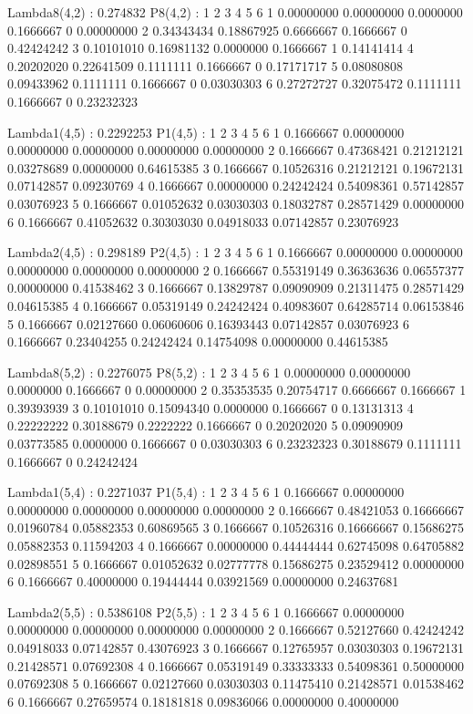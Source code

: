 \documentclass[
  nojss]{jss}
\begin{document}
\begin{CodeChunk}
\begin{CodeOutput}
Lambda8(4,2) : 0.274832
P8(4,2) : 
           1          2         3         4 5          6
1 0.00000000 0.00000000 0.0000000 0.1666667 0 0.00000000
2 0.34343434 0.18867925 0.6666667 0.1666667 0 0.42424242
3 0.10101010 0.16981132 0.0000000 0.1666667 1 0.14141414
4 0.20202020 0.22641509 0.1111111 0.1666667 0 0.17171717
5 0.08080808 0.09433962 0.1111111 0.1666667 0 0.03030303
6 0.27272727 0.32075472 0.1111111 0.1666667 0 0.23232323

Lambda1(4,5) : 0.2292253
P1(4,5) : 
          1          2          3          4          5          6
1 0.1666667 0.00000000 0.00000000 0.00000000 0.00000000 0.00000000
2 0.1666667 0.47368421 0.21212121 0.03278689 0.00000000 0.64615385
3 0.1666667 0.10526316 0.21212121 0.19672131 0.07142857 0.09230769
4 0.1666667 0.00000000 0.24242424 0.54098361 0.57142857 0.03076923
5 0.1666667 0.01052632 0.03030303 0.18032787 0.28571429 0.00000000
6 0.1666667 0.41052632 0.30303030 0.04918033 0.07142857 0.23076923

Lambda2(4,5) : 0.298189
P2(4,5) : 
          1          2          3          4          5          6
1 0.1666667 0.00000000 0.00000000 0.00000000 0.00000000 0.00000000
2 0.1666667 0.55319149 0.36363636 0.06557377 0.00000000 0.41538462
3 0.1666667 0.13829787 0.09090909 0.21311475 0.28571429 0.04615385
4 0.1666667 0.05319149 0.24242424 0.40983607 0.64285714 0.06153846
5 0.1666667 0.02127660 0.06060606 0.16393443 0.07142857 0.03076923
6 0.1666667 0.23404255 0.24242424 0.14754098 0.00000000 0.44615385

Lambda8(5,2) : 0.2276075
P8(5,2) : 
           1          2         3         4 5          6
1 0.00000000 0.00000000 0.0000000 0.1666667 0 0.00000000
2 0.35353535 0.20754717 0.6666667 0.1666667 1 0.39393939
3 0.10101010 0.15094340 0.0000000 0.1666667 0 0.13131313
4 0.22222222 0.30188679 0.2222222 0.1666667 0 0.20202020
5 0.09090909 0.03773585 0.0000000 0.1666667 0 0.03030303
6 0.23232323 0.30188679 0.1111111 0.1666667 0 0.24242424

Lambda1(5,4) : 0.2271037
P1(5,4) : 
          1          2          3          4          5          6
1 0.1666667 0.00000000 0.00000000 0.00000000 0.00000000 0.00000000
2 0.1666667 0.48421053 0.16666667 0.01960784 0.05882353 0.60869565
3 0.1666667 0.10526316 0.16666667 0.15686275 0.05882353 0.11594203
4 0.1666667 0.00000000 0.44444444 0.62745098 0.64705882 0.02898551
5 0.1666667 0.01052632 0.02777778 0.15686275 0.23529412 0.00000000
6 0.1666667 0.40000000 0.19444444 0.03921569 0.00000000 0.24637681

Lambda2(5,5) : 0.5386108
P2(5,5) : 
          1          2          3          4          5          6
1 0.1666667 0.00000000 0.00000000 0.00000000 0.00000000 0.00000000
2 0.1666667 0.52127660 0.42424242 0.04918033 0.07142857 0.43076923
3 0.1666667 0.12765957 0.03030303 0.19672131 0.21428571 0.07692308
4 0.1666667 0.05319149 0.33333333 0.54098361 0.50000000 0.07692308
5 0.1666667 0.02127660 0.03030303 0.11475410 0.21428571 0.01538462
6 0.1666667 0.27659574 0.18181818 0.09836066 0.00000000 0.40000000
\end{CodeOutput}
\end{CodeChunk}

\renewcommand\refname{References}

\end{document}
